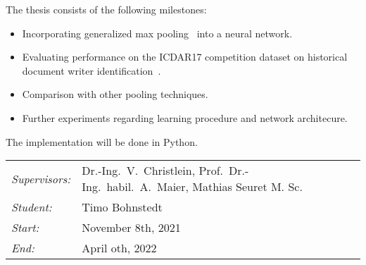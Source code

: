 \documentclass[12pt,a4paper]{article}
\begin{document}
The thesis consists of the following milestones:
\begin{itemize}
	\item Incorporating generalized max pooling~\cite{murray2017interferences,murray2014generalized} into a neural network.
	      	      	      	      	      	      	      		      		      	      	      	      	      	      	      	      	      	      	
	\item Evaluating performance on the ICDAR17	competition dataset on historical	document writer identification~\cite{ICDAR2017WI}.
	      	      	      	      	      	      	      		      		      	      	      	      	      	      	      	      	      	      
	\item Comparison with other pooling techniques.
	      	      	      	      	      	      	      		      		      	      	      	      	      	      	      	      	      	      	
	\item Further experiments regarding learning procedure and network architecure.
	      	      	      	      	      	      	      		      		      	      	      	      	      	      	      	      	      	      
\end{itemize}
		
		
The implementation will be done in Python.\\
		
\begin{tabular}{ll}
	\emph{Supervisors:} & Dr.-Ing.~V.~Christlein,  Prof.~Dr.-Ing.~habil.~A.~Maier, Mathias Seuret M. Sc.
	\\
	\emph{Student:}     & Timo Bohnstedt
	\\
	\emph{Start:}       & November 8th, 2021                                            \\
	\emph{End:}         & April oth, 2022                                        \\
\end{tabular}
\nopagebreak[4]
\small

		
\end{document}
